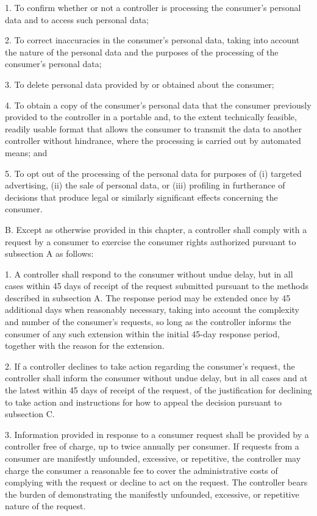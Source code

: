 1. To confirm whether or not a controller is processing the consumer's personal data and to access such personal data;

2. To correct inaccuracies in the consumer's personal data, taking into account the nature of the personal data and the purposes of the processing of the consumer's personal data;

3. To delete personal data provided by or obtained about the consumer;

4. To obtain a copy of the consumer's personal data that the consumer previously provided to the controller in a portable and, to the extent technically feasible, readily usable format that allows the consumer to transmit the data to another controller without hindrance, where the processing is carried out by automated means; and

5. To opt out of the processing of the personal data for purposes of (i) targeted advertising, (ii) the sale of personal data, or (iii) profiling in furtherance of decisions that produce legal or similarly significant effects concerning the consumer.

B. Except as otherwise provided in this chapter, a controller shall comply with a request by a consumer to exercise the consumer rights authorized pursuant to subsection A as follows:

1. A controller shall respond to the consumer without undue delay, but in all cases within 45 days of receipt of the request submitted pursuant to the methods described in subsection A. The response period may be extended once by 45 additional days when reasonably necessary, taking into account the complexity and number of the consumer's requests, so long as the controller informs the consumer of any such extension within the initial 45-day response period, together with the reason for the extension.

2. If a controller declines to take action regarding the consumer's request, the controller shall inform the consumer without undue delay, but in all cases and at the latest within 45 days of receipt of the request, of the justification for declining to take action and instructions for how to appeal the decision pursuant to subsection C.

3. Information provided in response to a consumer request shall be provided by a controller free of charge, up to twice annually per consumer. If requests from a consumer are manifestly unfounded, excessive, or repetitive, the controller may charge the consumer a reasonable fee to cover the administrative costs of complying with the request or decline to act on the request. The controller bears the burden of demonstrating the manifestly unfounded, excessive, or repetitive nature of the request.


